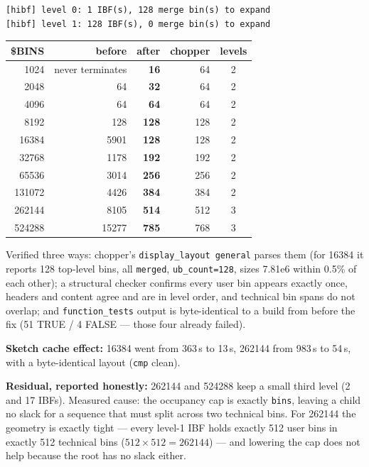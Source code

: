 \documentclass[11pt,a4paper]{article}
\newcommand{\code}[1]{\lstinline[basicstyle=\ttfamily\small]!#1!}
\newcommand{\good}[1]{\textcolor{okgreen}{\textbf{#1}}}
\newcommand{\bad}[1]{\textcolor{warn}{#1}}
\begin{document}
\begin{lstlisting}[style=codestyle,caption={The shape every dataset now has}]
[hibf] level 0: 1 IBF(s), 128 merge bin(s) to expand
[hibf] level 1: 128 IBF(s), 0 merge bin(s) to expand
\end{lstlisting}

\begin{longtable}{@{}rrrrc@{}}
\toprule
\textbf{\$BINS} & \textbf{before} & \textbf{after} & \textbf{chopper} & \textbf{levels} \\
\midrule
\endhead
1024   & \bad{never terminates} & \good{16}  & 64  & 2 \\
2048   & 64                     & \good{32}  & 64  & 2 \\
4096   & 64                     & \good{64}  & 64  & 2 \\
8192   & 128                    & \good{128} & 128 & 2 \\
16384  & \bad{5901}             & \good{128} & 128 & 2 \\
32768  & \bad{1178}             & \good{192} & 192 & 2 \\
65536  & \bad{3014}             & \good{256} & 256 & 2 \\
131072 & \bad{4426}             & \good{384} & 384 & 2 \\
262144 & \bad{8105}             & \good{514} & 512 & 3 \\
524288 & \bad{15277}            & \good{785} & 768 & 3 \\
\bottomrule
\end{longtable}

\noindent Verified three ways: chopper's \texttt{display\_layout general} parses them (for 16384 it
reports 128 top-level bins, all \texttt{merged}, \texttt{ub\_count=128}, sizes 7.81e6 within 0.5\%
of each other); a structural checker confirms every user bin appears exactly once, headers and
content agree and are in level order, and technical bin spans do not overlap; and
\texttt{function\_tests} output is byte-identical to a build from before the fix (51 TRUE / 4
FALSE --- those four already failed).

\medskip\noindent\textbf{Sketch cache effect:} 16384 went from 363\,s to 13\,s, 262144 from 983\,s
to 54\,s, with a byte-identical layout (\texttt{cmp} clean).

\medskip\noindent\textbf{Residual, reported honestly:} 262144 and 524288 keep a small third level
(2 and 17 IBFs). Measured cause: the occupancy cap is exactly \code{bins}, leaving a child no slack
for a sequence that must split across two technical bins. For 262144 the geometry is exactly tight
--- every level-1 IBF holds exactly 512 user bins in exactly 512 technical bins ($512 \times 512 =
262144$) --- and lowering the cap does not help because the root has no slack either.
\end{document}
